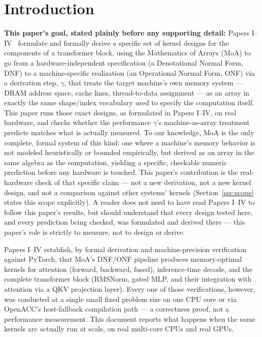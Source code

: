 \documentclass[11pt]{article}
\begin{document}
\section{Introduction}

\textbf{This paper's goal, stated plainly before any supporting
detail:} Papers I--IV~\cite{paper1,paper2,paper3,paper4} formulate and
formally derive a specific set of kernel designs for the components of
a transformer block, using the Mathematics of Arrays (MoA) to go from
a hardware-independent specification (a Denotational Normal Form, DNF)
to a machine-specific realization (an Operational Normal Form, ONF)
via a derivation step, $\gamma$, that treats the target machine's own
memory system --- DRAM address space, cache lines, thread-to-data
assignment --- as an array in exactly the same shape/index vocabulary
used to specify the computation itself. This paper runs those exact
designs, as formulated in Papers I--IV, on real hardware, and checks
whether the performance $\gamma$'s machine-as-array treatment predicts
matches what is actually measured. To our knowledge, MoA is the only
complete, formal system of this kind: one where a machine's memory
behavior is not modeled heuristically or bounded empirically, but
derived as an array in the same algebra as the computation, yielding a
specific, checkable numeric prediction before any hardware is touched.
This paper's contribution is the real-hardware check of that specific
claim --- not a new derivation, not a new kernel design, and not a
comparison against other systems' kernels (Section~\ref{sec:scope}
states this scope explicitly). A reader does not need to have read
Papers I--IV to follow this paper's results, but should understand
that every design tested here, and every prediction being checked, was
formulated and derived there --- this paper's role is strictly to
measure, not to design or derive.

Papers I--IV establish, by formal derivation and machine-precision
verification against PyTorch, that MoA's DNF/ONF pipeline produces
memory-optimal kernels for attention (forward, backward, fused),
inference-time decode, and the complete transformer block (RMSNorm,
gated MLP, and their integration with attention via a QKV projection
layer). Every one of those verifications, however, was conducted at a
single small fixed problem size on one CPU core or via OpenACC's
host-fallback compilation path --- a correctness proof, not a
performance measurement. This document reports what happens when the
same kernels are actually run at scale, on real multi-core CPUs and
real GPUs.
\end{document}
